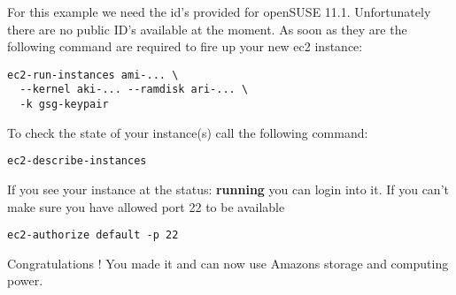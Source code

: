 For this example we need the id's provided for openSUSE 11.1.
Unfortunately there are no public ID's available at the moment.
As soon as they are the following command are required to
fire up your new ec2 instance:

\begin{Command}{13cm}
\begin{verbatim}
ec2-run-instances ami-... \
  --kernel aki-... --ramdisk ari-... \
  -k gsg-keypair
\end{verbatim}
\end{Command}

To check the state of your instance(s) call the following command:

\begin{Command}{10cm}
\begin{verbatim}
ec2-describe-instances
\end{verbatim}
\end{Command}

If you see your instance at the status: \textbf{running} you can login
into it. If you can't make sure you have allowed port 22 to be available

\begin{Command}{10cm}
\begin{verbatim}
ec2-authorize default -p 22
\end{verbatim}
\end{Command}

Congratulations ! You made it and can now use Amazons storage and
computing power.

